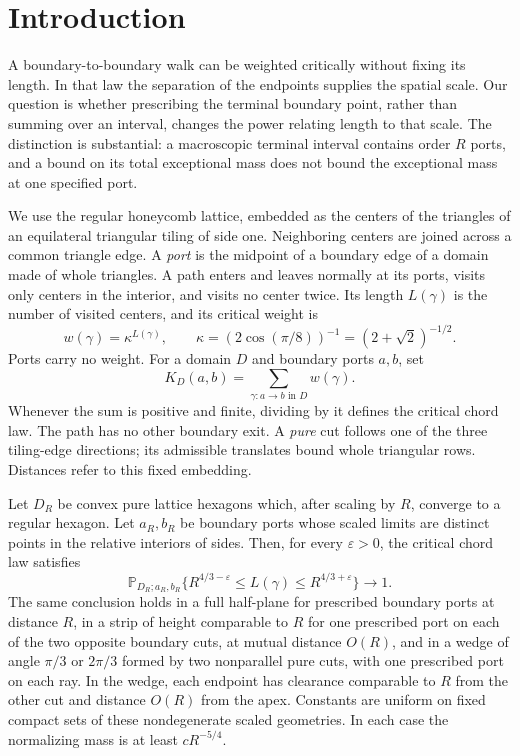 \section{Introduction}\label{c:introduction}
A boundary-to-boundary walk can be weighted critically without fixing its
length. In that law the separation of the endpoints supplies the spatial
scale. Our question is whether prescribing the terminal boundary point,
rather than summing over an interval, changes the power relating length
to that scale. The distinction is substantial: a macroscopic terminal
interval contains order $R$ ports, and a bound on its total exceptional
mass does not bound the exceptional mass at one specified port.

We use the regular honeycomb lattice, embedded as the centers of the
triangles of an equilateral triangular tiling of side one. Neighboring
centers are joined across a common triangle edge. A \emph{port} is the
midpoint of a boundary edge of a domain made of whole triangles. A path
enters and leaves normally at its ports, visits only centers in the
interior, and visits no center twice. Its length $L(\gamma)$ is the number
of visited centers, and its critical weight is
\[
 w(\gamma)=\kappa^{L(\gamma)},\qquad
 \kappa=(2\cos(\pi/8))^{-1}=(2+\sqrt2)^{-1/2}.
\]
Ports carry no weight. For a domain $D$ and boundary ports $a,b$, set
\[
 K_D(a,b)=\sum_{\gamma:a\to b\text{ in }D}w(\gamma).
\]
Whenever the sum is positive and finite, dividing by it defines the
critical chord law. The path has no other boundary exit. A \emph{pure}
cut follows one of the three tiling-edge directions; its admissible
translates bound whole triangular rows. Distances refer to this fixed
embedding.

\begin{theorem}\label{c:main}
Let $D_R$ be convex pure lattice hexagons which, after scaling by $R$,
converge to a regular hexagon. Let $a_R,b_R$ be boundary ports whose
scaled limits are distinct points in the relative interiors of sides.
Then, for every $\varepsilon>0$, the critical chord law satisfies
\[
 \mathbb P_{D_R;a_R,b_R}
 \{R^{4/3-\varepsilon}\le L(\gamma)\le R^{4/3+\varepsilon}\}
 \longrightarrow1.
\]
The same conclusion holds in a full half-plane for prescribed boundary
ports at distance $R$, in a strip of height comparable to $R$ for
one prescribed port on each of the two opposite boundary cuts, at mutual
distance $O(R)$, and in a wedge of angle
$\pi/3$ or $2\pi/3$ formed by two nonparallel pure cuts, with one prescribed port on each ray.
In the wedge, each endpoint has clearance comparable to $R$ from the other cut and
distance $O(R)$ from the apex. Constants are uniform on fixed compact
sets of these nondegenerate scaled geometries. In each case the
normalizing mass is at least $cR^{-5/4}$.
\end{theorem}

